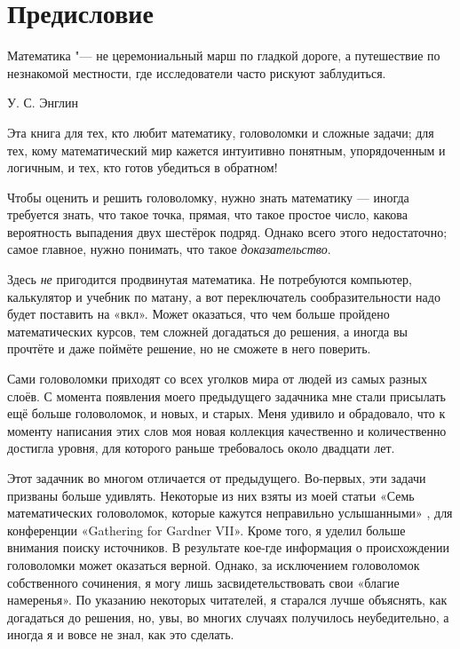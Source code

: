 \chapter*{Предисловие}

\setlength{\epigraphwidth}{.6\textwidth}
\epigraph{Математика "--- не церемониальный марш по гладкой дороге, а путешествие по незнакомой местности, где исследователи часто рискуют заблудиться.
}{У. С. Энглин
}

Эта книга для тех, кто любит математику, головоломки и сложные задачи;
для тех, кому математический мир кажется интуитивно понятным, упорядоченным и логичным, и тех, кто готов убедиться в обратном!

Чтобы оценить и решить головоломку, нужно знать математику --- 
иногда требуется знать, что такое точка, прямая, что такое простое число, какова вероятность выпадения двух шестёрок подряд.
Однако всего этого недостаточно; самое главное, нужно понимать, что такое \emph{доказательство}.

Здесь \emph{не} пригодится продвинутая математика.
Не потребуются компьютер, калькулятор и учебник по матану,
а вот переключатель сообразительности надо будет поставить на «вкл».
Может оказаться, что чем больше пройдено математических курсов, тем сложней догадаться до решения,
а иногда вы прочтёте и даже поймёте решение, но не сможете в него поверить.

Сами головоломки приходят со всех уголков мира от людей из самых разных слоёв.
С момента появления моего предыдущего задачника мне стали присылать ещё больше головоломок, и новых, и старых.
Меня удивило и обрадовало, что к моменту написания этих слов моя новая коллекция качественно и количественно достигла уровня, для которого раньше требовалось около двадцати лет.

Этот задачник во многом отличается от предыдущего.
Во-первых, эти задачи призваны больше удивлять.
Некоторые из них взяты из моей статьи «Семь математических головоломок, которые кажутся неправильно услышанными» \cite{winkler-7}, для конференции «Gathering for Gard\-ner VII».
Кроме того, я уделил больше внимания поиску источников.
В результате кое-где информация о происхождении головоломки может оказаться верной.
Однако, за исключением головоломок собственного сочинения, я могу лишь засвидетельствовать свои «благие намеренья».
По указанию некоторых читателей, я старался лучше объяснять, как догадаться до решения,
но, увы, во многих случаях получилось неубедительно, а иногда я и вовсе не знал, как это сделать.

